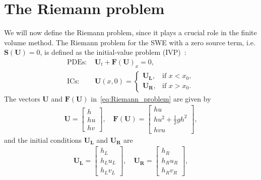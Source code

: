 \section{The Riemann problem}
We will now define the Riemann problem, since it plays a crucial role in the finite volume method.
The Riemann problem for the SWE with a zero source term, i.e. $\mathbf{S(U)} = 0$, is defined as the initial-value problem (IVP)~\cite{Toro2024}:
\begin{equation}\label{eq:Riemann_problem}
    \begin{aligned}
        \text{PDEs: } &\mathbf{U}_t + {\mathbf{F(U)}}_x = 0, \\
        \text{ICs: } &\mathbf{U}(x, 0) = \begin{cases}
            \mathbf{U_L}, & \text{if  } x < x_0, \\
            \mathbf{U_R}, & \text{if  } x > x_0.
        \end{cases}
    \end{aligned}
    \end{equation}
The vectors $\mathbf{U}$ and $\mathbf{F(U)}$ in~\eqref{eq:Riemann_problem} are given by
\begin{align}
    \mathbf{U} = \begin{bmatrix}
        h \\ hu \\ hv
    \end{bmatrix}, \quad
    \mathbf{F(U)} = \begin{bmatrix}
        hu \\ hu^2 + \frac{1}{2}gh^2 \\ hvu
    \end{bmatrix},
\end{align}
and the initial conditions $\mathbf{U_L}$ and $\mathbf{U_R}$ are
\begin{align*}
    \mathbf{U_L} = \begin{bmatrix}
        h_L \\ h_L u_L \\ h_L v_L
    \end{bmatrix}, \quad 
    \mathbf{U_R} = \begin{bmatrix}
        h_R \\ h_R u_R \\ h_R v_R
    \end{bmatrix},
\end{align*}
